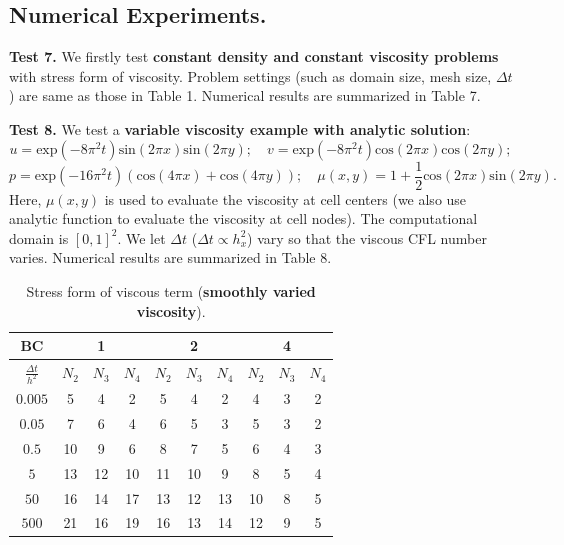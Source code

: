 \documentclass[9pt]{article}
\begin{document}
\subsection{Numerical Experiments.}

{\bf Test 7.} We firstly test {\bf constant density and constant viscosity problems} with stress form of viscosity. Problem settings (such as domain size, mesh size, $\Delta t$) are same as those in Table 1. Numerical results are summarized in Table 7.

{\bf Test 8.} We test a {\bf variable viscosity example with analytic solution}: %
$$
u=\mbox{exp}(-8\pi^2t)\mbox{sin}(2 \pi x)\mbox{sin}(2 \pi y); \quad v=\mbox{exp}(-8\pi^2t)\mbox{cos}(2 \pi x)\mbox{cos}(2 \pi y);
$$
$$
p=\mbox{exp}(-16 \pi^2 t)(\mbox{cos}(4 \pi x)+\mbox{cos}(4 \pi y));
\quad
\mu(x,y)=1+\frac{1}{2} \mbox{cos}(2 \pi x) \mbox{sin}(2 \pi y).
$$
Here, $\mu(x,y)$ is used to evaluate the viscosity at cell centers (we also use analytic function to evaluate the viscosity at cell nodes). The computational domain is $[0, 1]^2$. We let $\Delta t$ ($\Delta t  \propto {h_x^2}$) vary so that the viscous CFL number varies.
Numerical results are summarized in Table 8.
\begin{table}[h]
\begin{center}
\begin{tabular}{|c||ccc|ccc|ccc|}
\hline
BC     &     &1   &    &     &2   &     &   &4     & \\
\hline
$\frac{\Delta t}{h^2}$  &$N_2$ &$N_3$ &$N_4$  &$N_2$ &$N_3$ &$N_4$   &$N_2$ & $N_3$ &$N_4$  \\
\hline
\hline
$0.005$    &5  &4   &2    &5  &4  &2      &4   &3  &2 \\
\hline
$0.05$     &7  &6   &4    &6  &5  &3      &5   &3  &2\\
\hline
$0.5$     &10  &9   &6    &8  &7  &5      &6   &4  &3\\
\hline
  $5$     &13 &12   &10   &11 &10 &9      &8   &5  &4\\
\hline
 $50$     &16 &14   &17   &13 &12 &13    &10   &8  &5\\
\hline
$500$     &21 &16   &19   &16 &13 &14    &12   &9  &5\\
\hline
\end{tabular}
\vspace{2mm} \caption{Stress form of viscous term ({\bf smoothly varied viscosity}).
}
\end{center}
\end{table}
\end{document}
